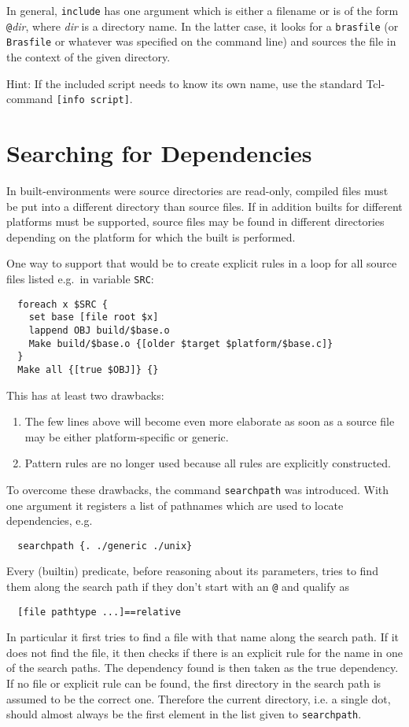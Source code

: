 \documentclass[11pt,bibtotoc,idxtotoc]{scrreprt}
\makeatletter
\newcommand{\brasfile}{\texttt{brasfile}}
\newcommand{\Brasfile}{\texttt{Brasfile}}
\newcommand{\Indextt}[1]{\texttt{#1}\index{#1@\texttt{#1}}}
\makeatother
\begin{document}
In general, \texttt{include} has one argument which is either a
filename or is of the form \texttt{@}\textit{dir}, where \textit{dir}
is a directory name. In the latter case, it looks for a \brasfile{} (or
\Brasfile{} or whatever was specified on the command line) and sources
the file in the context of the given directory.

Hint: If the included script needs to know its own name, use the
standard Tcl-command \texttt{[info script]}.
\section{Searching for Dependencies}
\label{sec:searchpath}

In built-environments were source directories are read-only, compiled
files must be put into a different directory than source files. If in
addition builts for different platforms must
be supported, source files may be found in different directories
depending on the platform for which the built is performed.

One way to support that would be to create explicit rules in a loop
for all source files listed e.g.\ in variable \texttt{SRC}:
\begin{verbatim}
  foreach x $SRC {
    set base [file root $x]
    lappend OBJ build/$base.o
    Make build/$base.o {[older $target $platform/$base.c]}
  }
  Make all {[true $OBJ]} {}
\end{verbatim}

This has at least two drawbacks:
\begin{enumerate}
\item The few lines above will become even more elaborate as soon as a
  source file may be either platform-specific or generic.
\item Pattern rules are no longer used because all rules are
  explicitly constructed.
\end{enumerate}

To overcome these drawbacks, the command \Indextt{searchpath} was
introduced. With one argument it registers a list of pathnames which are
used to locate dependencies, e.g.
\begin{verbatim}
  searchpath {. ./generic ./unix}
\end{verbatim}
Every (builtin) predicate, before reasoning about its parameters,
tries to find them along the search path if they don't start with an
\texttt{@} and qualify as
\begin{verbatim}
  [file pathtype ...]==relative
\end{verbatim}
In particular it first tries to find a file with that name along the
search path. If it does not find the file, it then checks if there is
an explicit rule for the name in one of the search paths. The
dependency found is then taken as the true dependency. If no file or
explicit rule can be found, the first directory in the search path is
assumed to be the correct one. Therefore the current directory, i.e. a
single dot, should almost always be the first element in the list
given to \texttt{searchpath}.
\end{document}
